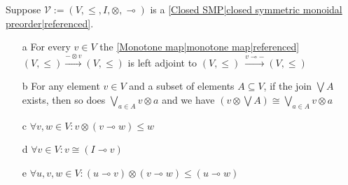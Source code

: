
Suppose $\mathcal{V}:=(V,\leq,I,\otimes,\multimap)$ is a \ref{Closed SMP|closed symmetric monoidal preorder|referenced}.
    \begin{itemize}
      \item[a] For every $v \in V$ the \ref{Monotone map|monotone map|referenced} $(V, \leq) \xrightarrow{-\otimes v}(V,\leq)$ is left adjoint to $(V, \leq)\ \xrightarrow{v \multimap -} (V,\leq)$
      \item[b]For any element $v \in V$ and a subset of elements $A \subseteq V$, if the join $\bigvee A$ exists, then so does $\bigvee_{a \in A} v \otimes a$ and we have $(v \otimes \bigvee A)\cong  \bigvee_{a \in A} v \otimes a$
      \item[c]$\forall v,w \in V: v \otimes (v \multimap w) \leq w$
      \item[d]$\forall v \in V: v \cong (I \multimap v)$
      \item[e]$\forall u,v,w \in V: (u \multimap v) \otimes (v \multimap w) \leq (u \multimap w)$
    \end{itemize}